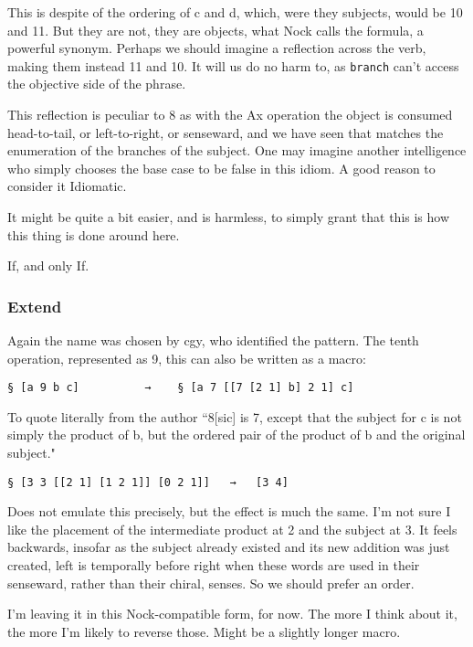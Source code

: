 \documentclass[twoside]{article}
\begin{document}
This is despite of the ordering of c and d, which, were they subjects, would be 10 and 11. But they are not, they are objects, what Nock calls the formula, a powerful synonym. Perhaps we should imagine a reflection across the verb, making them instead 11 and 10. It will us do no harm to, as \texttt{branch} can't access the objective side of the phrase.

This reflection is peculiar to 8 as with the Ax operation the object is consumed head-to-tail, or left-to-right, or senseward, and we have seen that matches the enumeration of the branches of the subject. One may imagine another intelligence who simply chooses the base case to be false in this idiom. A good reason to consider it Idiomatic.

It might be quite a bit easier, and is harmless, to simply grant that this is how this thing is done around here.

If, and only If.

\subsubsection{Extend}

Again the name was chosen by cgy, who identified the pattern. The tenth operation, represented as 9, this can also be written as a macro:

\begin{lstlisting}[style=listingblock]
§ [a 9 b c]          →    § [a 7 [[7 [2 1] b] 2 1] c]
\end{lstlisting}

To quote literally from the author ``8[sic] is 7, except that the subject for c is not simply the product of b, but the ordered pair of the product of b and the original subject."

\begin{lstlisting}[style=listingblock]
§ [3 3 [[2 1] [1 2 1]] [0 2 1]]   →   [3 4]
\end{lstlisting}

Does not emulate this precisely, but the effect is much the same. I'm not sure I like the placement of the intermediate product at 2 and the subject at 3. It feels backwards, insofar as the subject already existed and its new addition was just created, left is temporally before right when these words are used in their senseward, rather than their chiral, senses. So we should prefer an order.

I'm leaving it in this Nock-compatible form, for now. The more I think about it, the more I'm likely to reverse those. Might be a slightly longer macro.
\end{document}
